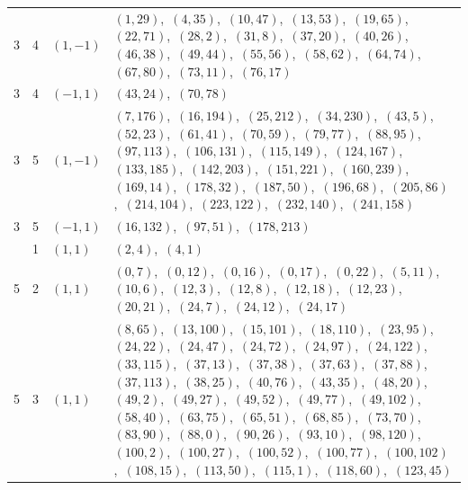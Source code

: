 \documentclass[11pt]{article}
\begin{document}
\begin{longtable}{@{}rrl>{\raggedright\arraybackslash}p{}@{}}
3 & 4 & $(1,-1)$ & $(1,29)$,\allowbreak\ $(4,35)$,\allowbreak\ $(10,47)$,\allowbreak\ $(13,53)$,\allowbreak\ $(19,65)$,\allowbreak\ $(22,71)$,\allowbreak\ $(28,2)$,\allowbreak\ $(31,8)$,\allowbreak\ $(37,20)$,\allowbreak\ $(40,26)$,\allowbreak\ $(46,38)$,\allowbreak\ $(49,44)$,\allowbreak\ $(55,56)$,\allowbreak\ $(58,62)$,\allowbreak\ $(64,74)$,\allowbreak\ $(67,80)$,\allowbreak\ $(73,11)$,\allowbreak\ $(76,17)$\\
3 & 4 & $(-1,1)$ & $(43,24)$,\allowbreak\ $(70,78)$\\
3 & 5 & $(1,-1)$ & $(7,176)$,\allowbreak\ $(16,194)$,\allowbreak\ $(25,212)$,\allowbreak\ $(34,230)$,\allowbreak\ $(43,5)$,\allowbreak\ $(52,23)$,\allowbreak\ $(61,41)$,\allowbreak\ $(70,59)$,\allowbreak\ $(79,77)$,\allowbreak\ $(88,95)$,\allowbreak\ $(97,113)$,\allowbreak\ $(106,131)$,\allowbreak\ $(115,149)$,\allowbreak\ $(124,167)$,\allowbreak\ $(133,185)$,\allowbreak\ $(142,203)$,\allowbreak\ $(151,221)$,\allowbreak\ $(160,239)$,\allowbreak\ $(169,14)$,\allowbreak\ $(178,32)$,\allowbreak\ $(187,50)$,\allowbreak\ $(196,68)$,\allowbreak\ $(205,86)$,\allowbreak\ $(214,104)$,\allowbreak\ $(223,122)$,\allowbreak\ $(232,140)$,\allowbreak\ $(241,158)$\\
3 & 5 & $(-1,1)$ & $(16,132)$,\allowbreak\ $(97,51)$,\allowbreak\ $(178,213)$\\
\addlinespace[3pt]
5 & 1 & $(1,1)$ & $(2,4)$,\allowbreak\ $(4,1)$\\
5 & 2 & $(1,1)$ & $(0,7)$,\allowbreak\ $(0,12)$,\allowbreak\ $(0,16)$,\allowbreak\ $(0,17)$,\allowbreak\ $(0,22)$,\allowbreak\ $(5,11)$,\allowbreak\ $(10,6)$,\allowbreak\ $(12,3)$,\allowbreak\ $(12,8)$,\allowbreak\ $(12,18)$,\allowbreak\ $(12,23)$,\allowbreak\ $(20,21)$,\allowbreak\ $(24,7)$,\allowbreak\ $(24,12)$,\allowbreak\ $(24,17)$\\
5 & 3 & $(1,1)$ & $(8,65)$,\allowbreak\ $(13,100)$,\allowbreak\ $(15,101)$,\allowbreak\ $(18,110)$,\allowbreak\ $(23,95)$,\allowbreak\ $(24,22)$,\allowbreak\ $(24,47)$,\allowbreak\ $(24,72)$,\allowbreak\ $(24,97)$,\allowbreak\ $(24,122)$,\allowbreak\ $(33,115)$,\allowbreak\ $(37,13)$,\allowbreak\ $(37,38)$,\allowbreak\ $(37,63)$,\allowbreak\ $(37,88)$,\allowbreak\ $(37,113)$,\allowbreak\ $(38,25)$,\allowbreak\ $(40,76)$,\allowbreak\ $(43,35)$,\allowbreak\ $(48,20)$,\allowbreak\ $(49,2)$,\allowbreak\ $(49,27)$,\allowbreak\ $(49,52)$,\allowbreak\ $(49,77)$,\allowbreak\ $(49,102)$,\allowbreak\ $(58,40)$,\allowbreak\ $(63,75)$,\allowbreak\ $(65,51)$,\allowbreak\ $(68,85)$,\allowbreak\ $(73,70)$,\allowbreak\ $(83,90)$,\allowbreak\ $(88,0)$,\allowbreak\ $(90,26)$,\allowbreak\ $(93,10)$,\allowbreak\ $(98,120)$,\allowbreak\ $(100,2)$,\allowbreak\ $(100,27)$,\allowbreak\ $(100,52)$,\allowbreak\ $(100,77)$,\allowbreak\ $(100,102)$,\allowbreak\ $(108,15)$,\allowbreak\ $(113,50)$,\allowbreak\ $(115,1)$,\allowbreak\ $(118,60)$,\allowbreak\ $(123,45)$\\

\end{longtable}
\end{document}
